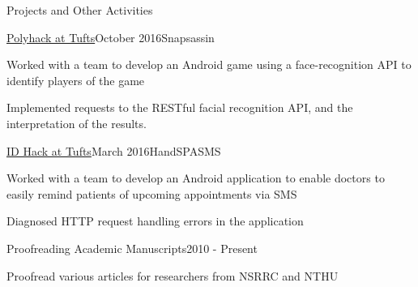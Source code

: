 \documentclass{resume} %
\begin{document}
\begin{rSection}{Projects and Other Activities}

\begin{rSubsection}{\href{http://2016.polyhack.tufts.io/}{Polyhack at Tufts}}{October 2016}{Snapsassin}
\item Worked with a team to develop an Android game using a face-recognition
    API to identify players of the game
\item Implemented requests to the RESTful facial recognition API, and the
    interpretation of the results.
\end{rSubsection}

\begin{rSubsection}{\href{https://idhack16.devpost.com/}{ID Hack at Tufts}}{March 2016}{HandSPASMS}
\item Worked with a team to develop an Android application to enable doctors
    to easily remind patients of upcoming appointments via SMS
\item Diagnosed HTTP request handling errors in the application
\end{rSubsection}

\begin{rSubsection}{Proofreading Academic Manuscripts}{2010 - Present}{}
\item Proofread various articles for researchers from NSRRC and NTHU
\end{rSubsection}

\bigskip
\end{rSection}





\end{document}
